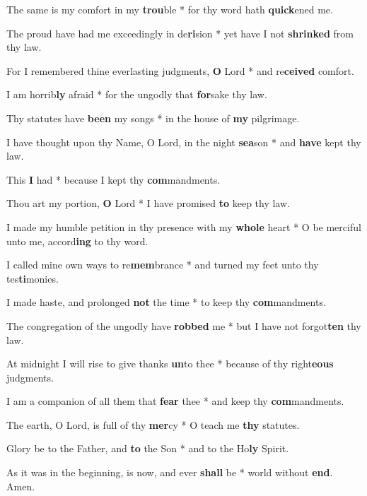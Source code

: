\begin{multicols}{2}
	The same is my comfort in my \textbf{trou}ble * for thy word hath \textbf{quick}ened me.
	
	The proud have had me exceedingly in de\textbf{ri}sion * yet have I not \textbf{shrinked} from thy law.
	
	For I remembered thine everlasting judgments, \textbf{O} Lord * and re\textbf{ceived} comfort.
	
	I am horrib\textbf{ly} afraid * for the ungodly that \textbf{for}sake thy law.
	
	Thy statutes have \textbf{been} my songs * in the house of \textbf{my} pilgrimage.
	
	I have thought upon thy Name, O Lord, in the night \textbf{sea}son * and \textbf{have} kept thy law.
	
	This \textbf{I} had * because I kept thy \textbf{com}mandments.
	
	Thou art my portion, \textbf{O} Lord * I have promised \textbf{to} keep thy law.
	
	I made my humble petition in thy presence with my \textbf{whole} heart * O be merciful unto me, accord\textbf{ing} to thy word.
	
	I called mine own ways to re\textbf{mem}brance * and turned my feet unto thy tes\textbf{ti}monies.
	
	I made haste, and prolonged \textbf{not} the time * to keep thy \textbf{com}mandments.
	
	The congregation of the ungodly have \textbf{robbed} me * but I have not forgot\textbf{ten} thy law.
	
	At midnight I will rise to give thanks \textbf{un}to thee * because of thy right\textbf{eous} judgments.
	
	I am a companion of all them that \textbf{fear} thee * and keep thy \textbf{com}mandments.
	
	The earth, O Lord, is full of thy \textbf{mer}cy * O teach me \textbf{thy} statutes.
	
	Glory be to the Father, and \textbf{to} the Son * and to the Ho\textbf{ly} Spirit.
	
	As it was in the beginning, is now, and ever \textbf{shall} be * world without \textbf{end}. Amen.
\end{multicols}